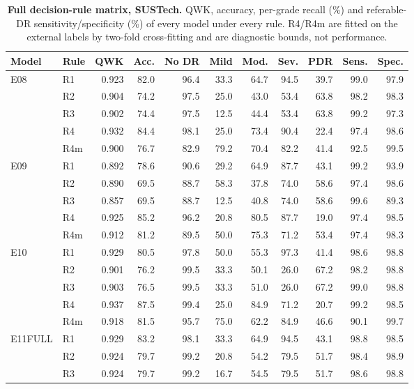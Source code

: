 \begin{table}[h]
\caption{\textbf{Full decision-rule matrix, SUSTech.} QWK, accuracy, per-grade recall (\%) and referable-DR sensitivity/specificity (\%) of every model under every rule. R4/R4m are fitted on the external labels by two-fold cross-fitting and are diagnostic bounds, not performance.}\label{tab:rules_sustech}
\centering\scriptsize
\begin{tabular}{@{}llrrrrrrrrr@{}}
\toprule
Model & Rule & QWK & Acc. & No DR & Mild & Mod. & Sev. & PDR & Sens. & Spec. \\
\midrule
E08 & R1 & 0.923 & 82.0 & 96.4 & 33.3 & 64.7 & 94.5 & 39.7 & 99.0 & 97.9 \\
 & R2 & 0.904 & 74.2 & 97.5 & 25.0 & 43.0 & 53.4 & 63.8 & 98.2 & 98.3 \\
 & R3 & 0.902 & 74.4 & 97.5 & 12.5 & 44.4 & 53.4 & 63.8 & 99.2 & 97.3 \\
 & R4 & 0.932 & 84.4 & 98.1 & 25.0 & 73.4 & 90.4 & 22.4 & 97.4 & 98.6 \\
 & R4m & 0.900 & 76.7 & 82.9 & 79.2 & 70.4 & 82.2 & 41.4 & 92.5 & 99.5 \\
\addlinespace
E09 & R1 & 0.892 & 78.6 & 90.6 & 29.2 & 64.9 & 87.7 & 43.1 & 99.2 & 93.9 \\
 & R2 & 0.890 & 69.5 & 88.7 & 58.3 & 37.8 & 74.0 & 58.6 & 97.4 & 98.6 \\
 & R3 & 0.857 & 69.5 & 88.7 & 12.5 & 40.8 & 74.0 & 58.6 & 99.6 & 89.3 \\
 & R4 & 0.925 & 85.2 & 96.2 & 20.8 & 80.5 & 87.7 & 19.0 & 97.4 & 98.5 \\
 & R4m & 0.912 & 81.2 & 89.5 & 50.0 & 75.3 & 71.2 & 53.4 & 97.4 & 98.3 \\
\addlinespace
E10 & R1 & 0.929 & 80.5 & 97.8 & 50.0 & 55.3 & 97.3 & 41.4 & 98.6 & 98.8 \\
 & R2 & 0.901 & 76.2 & 99.5 & 33.3 & 50.1 & 26.0 & 67.2 & 98.2 & 98.8 \\
 & R3 & 0.903 & 76.5 & 99.5 & 33.3 & 51.0 & 26.0 & 67.2 & 99.0 & 98.8 \\
 & R4 & 0.937 & 87.5 & 99.4 & 25.0 & 84.9 & 71.2 & 20.7 & 99.2 & 98.5 \\
 & R4m & 0.918 & 81.5 & 95.7 & 75.0 & 62.2 & 84.9 & 46.6 & 90.1 & 99.7 \\
\addlinespace
E11FULL & R1 & 0.929 & 83.2 & 98.1 & 33.3 & 64.9 & 94.5 & 43.1 & 98.8 & 98.5 \\
 & R2 & 0.924 & 79.7 & 99.2 & 20.8 & 54.2 & 79.5 & 51.7 & 98.4 & 98.9 \\
 & R3 & 0.924 & 79.7 & 99.2 & 16.7 & 54.5 & 79.5 & 51.7 & 98.6 & 98.8 \\

\end{tabular}
\end{table}
